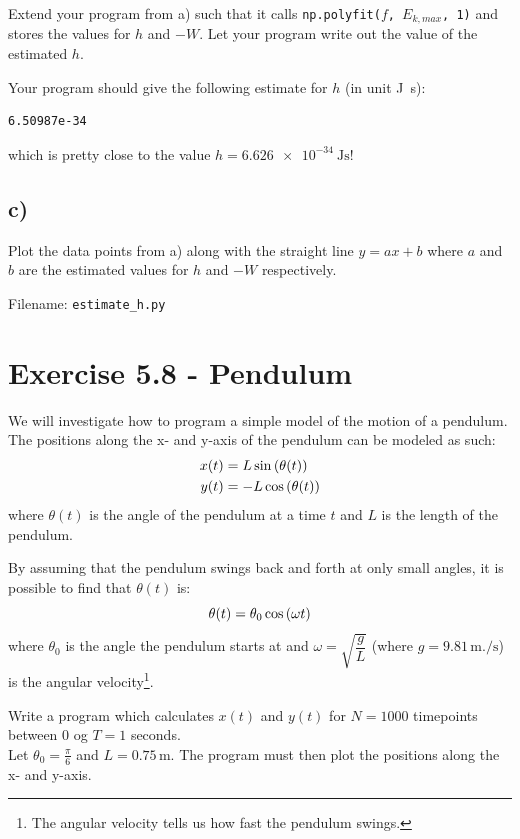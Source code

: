 \documentclass[10pt,a4paper]{article}
\begin{document}
Extend your program from a) such that it calls \texttt{np.polyfit($f$, $E_{k,max}$, 1)}  and stores the values for $h$ and $-W$. Let your program write out the value of the estimated $h$. 

Your program should give the following estimate for $h$ (in unit \si{\joule.\second}):
\begin{verbatim}
6.50987e-34
\end{verbatim}
which is pretty close to the value $h= \SI{6.626e-34}{\joule\second}$! 
\subsection*{c)}
Plot the data points from a) along with the straight line  $y = ax + b$ where $a$ and $b$ are the estimated values for $h$ and $-W$ respectively. 

Filename: \texttt{estimate\_h.py}



\section*{Exercise 5.8 - Pendulum}

We will investigate how to program a simple model of the motion of a pendulum. \\
The positions along the x- and y-axis of the pendulum can be modeled as such:
\begin{align*}
x(t) &= L\sin\qty(\theta(t)) \\
y(t) &= -L\cos\qty(\theta(t))
\end{align*}
where $\theta(t)$ is the angle of the pendulum at a time $t$ and $L$ is the length of the pendulum. 

By assuming that the pendulum swings back and forth at only small angles, it is possible to find that $\theta(t)$ is:
\[
\theta(t) = \theta_0\cos\qty(\omega t)
\]
where $\theta_0$ is the angle the pendulum starts at and  $\omega = \sqrt{\dfrac{g}{L}}$  (where $g = 9.81\,\si{\meter.\per\second}$) is the angular velocity\footnote{The angular velocity tells us how fast the pendulum swings.}. 

Write a program which calculates $x(t)$ and $y(t)$ for $N = 1000$ timepoints between 0 og $T = 1$ seconds.\\
Let  $\theta_0 = \frac{\pi}{6}$ and $L = 0.75\,\si{\meter}$. The program must then plot the positions along the x- and y-axis. 
\end{document}
